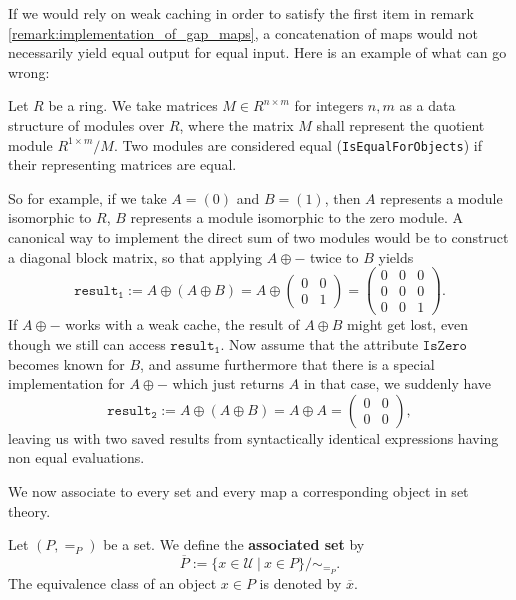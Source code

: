 \begin{example}
 If we would rely on weak caching in order to satisfy the first item in remark \ref{remark:implementation_of_gap_maps},
 a concatenation of \GAP maps would not necessarily yield equal output for equal input.
 Here is an example of what can go wrong:
 
 Let $R$ be a ring. We take matrices $M \in R^{n \times m}$ for integers $n,m$ as a data structure of
 modules over $R$, where the matrix $M$ shall represent the quotient module $R^{ 1 \times m }/ M$.
 Two modules are considered equal (\texttt{IsEqualForObjects}) if their representing matrices are equal.
 
 So for example, if we take $A = ( 0 )$ and $B = ( 1 )$, then $A$ represents a module isomorphic to $R$, 
 $B$ represents a module isomorphic to the zero module.
 A canonical way to implement the direct sum of two modules would be to construct a diagonal block matrix,
 so that applying $A \oplus -$ twice to $B$ yields
 \[
  \mathtt{result_1 := }
  A \oplus( A \oplus B ) =
  A \oplus
  \begin{pmatrix}
   0 & 0 \\
   0 & 1
  \end{pmatrix} =
  \begin{pmatrix}
   0 & 0 & 0 \\
   0 & 0 & 0 \\
   0 & 0 & 1
  \end{pmatrix}.
 \]
 If $A \oplus - $ works with a weak cache, the result of $A \oplus B$ might get lost, even though we still can access $\mathtt{result_1}$.
 Now assume that the attribute $\texttt{IsZero}$ becomes known for $B$, and assume furthermore that there is a special implementation
 for $A \oplus -$ which just returns $A$ in that case, we suddenly have
 \[
  \mathtt{result_2 := }
  A \oplus( A \oplus B ) =
  A \oplus A =
  \begin{pmatrix}
   0 & 0 \\
   0 & 0 
  \end{pmatrix},
 \]
leaving us with two saved results from syntactically identical expressions
having non equal evaluations.
\end{example}

We now associate to every \GAP set and every \GAP map a corresponding object in set theory.

\begin{definition}
 Let $(P, =_P)$ be a \GAP set. We define the \textbf{associated set} by
 \[
  \overline{P} := \{ x \in \mathcal{U} ~|~ x \in P \} / \sim_{ =_P }.
 \]
 The equivalence class of an object $x \in P$ is denoted by $\overline{x}$.
\end{definition}

